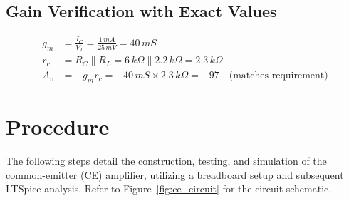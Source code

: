 \documentclass[conference]{IEEEtran}
\begin{document}
\subsection{Gain Verification with Exact Values}
\begin{align*}
    g_m &= \frac{I_C}{V_T} = \frac{1\,mA}{25\,mV} = 40\,mS \\
    r_c &= R_C \parallel R_L = 6\,k\Omega \parallel 2.2\,k\Omega = 2.3\,k\Omega \\
    A_v &= -g_m r_c = -40\,mS \times 2.3\,k\Omega = -97 \quad \text{(matches requirement)}
\end{align*}

\section{Procedure}
The following steps detail the construction, testing, and simulation of the common-emitter (CE) amplifier, utilizing a breadboard setup and subsequent LTSpice analysis. Refer to Figure~\ref{fig:ce_circuit} for the circuit schematic.
\end{document}

